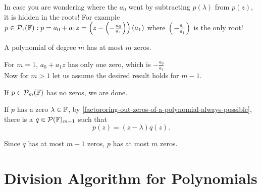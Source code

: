 In case you are wondering where the $a_0$ went by subtracting $p(\lambda)$ from $p(z)$, it is hidden in the roots! For example $p\in \mathcal{P}_1(\mathbb{F}): p=a_0+a_1z = \left(z- \left(-\frac{a_0}{a_1}\right)\right)(a_1)$ where $\left(-\frac{a_0}{a_1}\right)$ is the only root!

\setcounter{thm}{7}
\begin{thm}
  \label{thm: a polynomial of degree m has at most m zeros}
  A polynomial of degree $m$ has at most $m$ zeros.
\end{thm}
\begin{prf}
  For $m=1$, $a_0+a_1z$ has only one zero, which is $-\frac{a_0}{a_1}$\\
  Now for $m>1$ let us assume the desired result holds for $m-1$.

  If $p\in \mathcal{P}_{m}(\mathbb{F})$ has no zeros, we are done.

  If $p$ has a zero $\lambda \in \mathbb{F}$, by \ref{factororing-out-zeros-of-a-polynomial-always-possible}, there is a $q \in \mathcal{P}(\mathbb{F})_{m-1}$ such that
  \begin{equation}
  	p(z)=(z-\lambda)q(z).
  \end{equation}

  Since $q$ has at most $m-1$ zeros, $p$ has at most $m$ zeros.
\end{prf}

\section{Division Algorithm for Polynomials}


